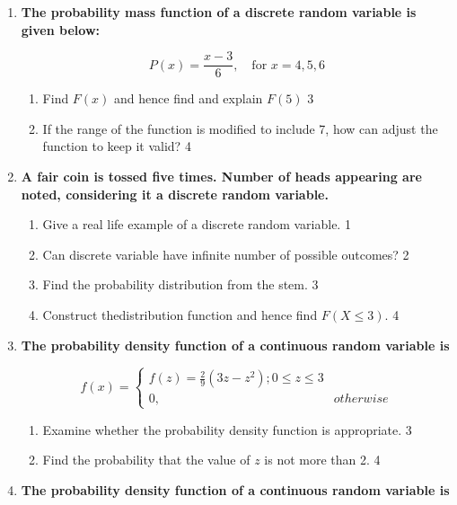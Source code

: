 \documentclass[a4paper,oneside]{book}
\begin{document}
\begin{enumerate}
  
   \item
	  \textbf{The probability mass function of a discrete random variable is given below:} 
  
   \begin{center}
	  \[
P(x) = \frac{x - 3}{6}, \quad \text{for } x = 4, 5, 6
\]
	  \end{center}
  
  \begin{enumerate}
    \item  
	Find $F(x)$ and hence find and explain $F(5)$ \hfill 3
    \item
	If the range of the function is modified to include 7, how can adjust the function to keep it valid? \hfill 4
  \end{enumerate}

  
   \item
	  \textbf{A fair coin is tossed five times. Number of heads appearing are noted, considering it a discrete random variable.} 
  
  \begin{enumerate}
    \item
	Give a real life example of a discrete random variable. \hfill 1
    \item
	Can discrete variable have infinite number of possible outcomes? \hfill 2
    \item  
	Find the probability distribution from the stem. \hfill 3
    \item
	Construct thedistribution function and hence find $F(X \le 3)$. \hfill 4
  \end{enumerate}
  
 \item
  \textbf{The probability density function of a continuous random variable is}

$$
  f(x) =
\begin{cases}
f(z) = \frac29 (3z-z^2); 0 \le z \le 3 \\
0, & otherwise
\end{cases}
$$
  
  \begin{enumerate}
    \item  
	Examine whether the probability density function is appropriate. \hfill 3
    \item
	Find the probability that the value of $z$ is not more than 2. \hfill 4
  \end{enumerate}
  
  \item
  \textbf{The probability density function of a continuous random variable is}


\end{enumerate}
\end{document}
